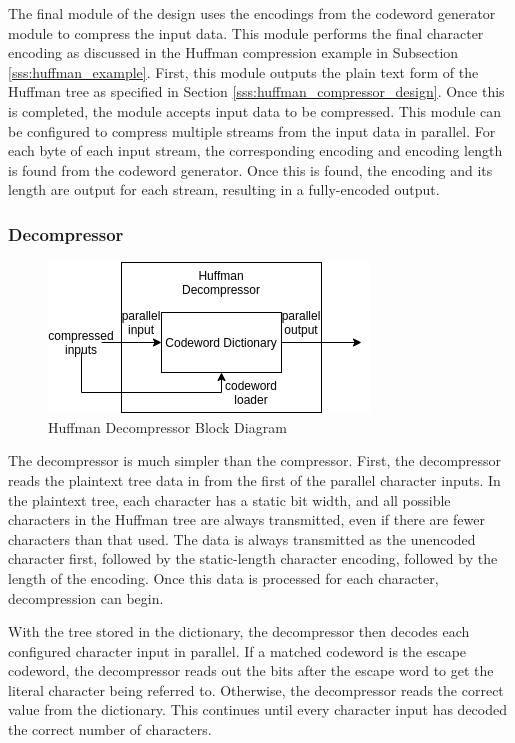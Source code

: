 \documentclass[doublespace,nopageskip]{VTthesis}
\begin{document}
The final module of the design uses the encodings from the codeword generator module to compress the input data. This module performs the final character encoding as discussed in the Huffman compression example in Subsection \ref{sss:huffman_example}. First, this module outputs the plain text form of the Huffman tree as specified in Section \ref{sss:huffman_compressor_design}. Once this is completed, the module accepts input data to be compressed. This module can be configured to compress multiple streams from the input data in parallel. For each byte of each input stream, the corresponding encoding and encoding length is found from the codeword generator. Once this is found, the encoding and its length are output for each stream, resulting in a fully-encoded output.

\subsubsection{Decompressor}\label{sss:huffman_decompressor_implementation}

\begin{figure}[htb]
	\centering
	\includegraphics[scale=1]{Huffman Decompressor Block Diagram.png}
	\caption{Huffman Decompressor Block Diagram}
	\label{fig:huffman_decompressor_block_diagram}
\end{figure}

The decompressor is much simpler than the compressor. First, the decompressor reads the plaintext tree data in from the first of the parallel character inputs. In the plaintext tree, each character has a static bit width, and all possible characters in the Huffman tree are always transmitted, even if there are fewer characters than that used. The data is always transmitted as the unencoded character first, followed by the static-length character encoding, followed by the length of the encoding. Once this data is processed for each character, decompression can begin.

With the tree stored in the dictionary, the decompressor then decodes each configured character input in parallel. If a matched codeword is the escape codeword, the decompressor reads out the bits after the escape word to get the literal character being referred to. Otherwise, the decompressor reads the correct value from the dictionary. This continues until every character input has decoded the correct number of characters.
\end{document}
